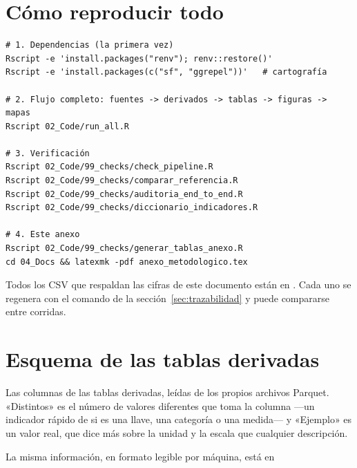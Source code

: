 \documentclass[11pt,a4paper]{article}
\begin{document}
\section{Cómo reproducir todo}

\begin{verbatim}
# 1. Dependencias (la primera vez)
Rscript -e 'install.packages("renv"); renv::restore()'
Rscript -e 'install.packages(c("sf", "ggrepel"))'   # cartografía

# 2. Flujo completo: fuentes -> derivados -> tablas -> figuras -> mapas
Rscript 02_Code/run_all.R

# 3. Verificación
Rscript 02_Code/99_checks/check_pipeline.R
Rscript 02_Code/99_checks/comparar_referencia.R
Rscript 02_Code/99_checks/auditoria_end_to_end.R
Rscript 02_Code/99_checks/diccionario_indicadores.R

# 4. Este anexo
Rscript 02_Code/99_checks/generar_tablas_anexo.R
cd 04_Docs && latexmk -pdf anexo_metodologico.tex
\end{verbatim}

\vspace{1em}
\noindent
\textcolor{tintatres}{\small
Todos los CSV que respaldan las cifras de este documento están en
. Cada uno se regenera con el comando de la
sección~\ref{sec:trazabilidad} y puede compararse entre corridas.}

\appendix
\clearpage
\section{Esquema de las tablas derivadas}
\label{ap:esquemas}

Las \cifraColumnasDerivadas{} columnas de las \cifraTablasDerivadas{} tablas
derivadas, leídas de los propios archivos Parquet. «Distintos» es el número de
valores diferentes que toma la columna —un indicador rápido de si es una llave,
una categoría o una medida— y «Ejemplo» es un valor real, que dice más sobre la
unidad y la escala que cualquier descripción.

La misma información, en formato legible por máquina, está en

\vspace{2pt}
\noindent\hspace*{1em}
\vspace{2pt}

\vspace{6pt}
{\scriptsize

}
\end{document}
